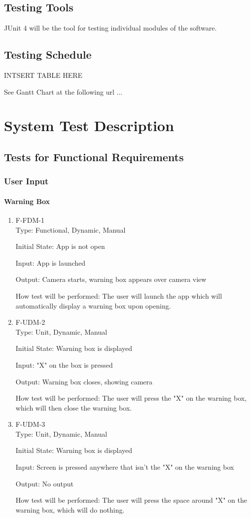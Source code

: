 \documentclass[12pt, titlepage]{article}
\begin{document}
\subsection{Testing Tools}
\par JUnit 4 will be the tool for testing individual modules of the software.
\subsection{Testing Schedule}

INTSERT TABLE HERE
		
See Gantt Chart at the following url ...
\section{System Test Description}
	
\subsection{Tests for Functional Requirements}
\subsubsection{User Input}
\paragraph{Warning Box}
\begin{enumerate}
\item{F-FDM-1\\}
Type: Functional, Dynamic, Manual
					
Initial State: 
App is not open
					
Input: 
App is launched
					
Output: 
Camera starts, warning box appears over camera view
					
How test will be performed: 
The user will launch the app which will automatically display a warning box upon opening.

\item{F-UDM-2\\}
Type: Unit, Dynamic, Manual
					
Initial State: 
Warning box is displayed
					
Input: 
"X" on the box is pressed
					
Output: 
Warning box closes, showing camera
					
How test will be performed: 
The user will press the "X" on the warning box, which will then close the warning box.

\item{F-UDM-3\\}
Type: Unit, Dynamic, Manual
					
Initial State: 
Warning box is displayed
					
Input: 
Screen is pressed anywhere that isn't the "X" on the warning box
					
Output: 
No output
					
How test will be performed: 
The user will press the space around "X" on the warning box, which will do nothing.

\end{enumerate}
\end{document}
